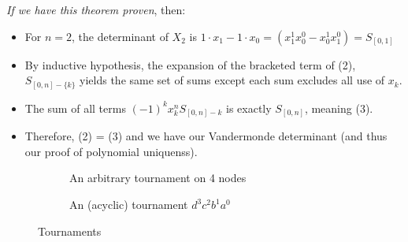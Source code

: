 \documentclass[11pt, oneside]{article} 	%
\begin{document}
\emph{If we have this theorem proven}, then:

\begin{itemize}
\item For $n=2$, the determinant of $X_2$ is $1\cdot x_1 - 1 \cdot x_0 = (x_1^1x_0^0 - x_0^1x_1^0) = S_{[0,1]}$
\item By inductive hypothesis, the expansion of the bracketed term of (2), $S_{[0,n]-\{k\}}$ yields the same set of sums except each sum excludes all use of $x_k$.
\item The sum of all terms $(-1)^kx_k^nS_{[0,n]-{k}}$ is exactly $S_{[0,n]}$, meaning (3).
\item Therefore, (2) = (3) and we have our Vandermonde determinant (and thus  our proof of polynomial uniquenss).
\end{itemize}




\begin{figure}
\centering
\begin{subfigure}{.5\textwidth}
  \centering

  \caption{An arbitrary tournament on 4 nodes}
  \label{fig:sub1}
\end{subfigure}
\begin{subfigure}{.5\textwidth}
  \centering
  \caption{An (acyclic) tournament $d^3c^2b^1a^0$}
  \label{fig:sub2}
\end{subfigure}
\caption{Tournaments}
\label{fig:test}
\end{figure}
\end{document}
